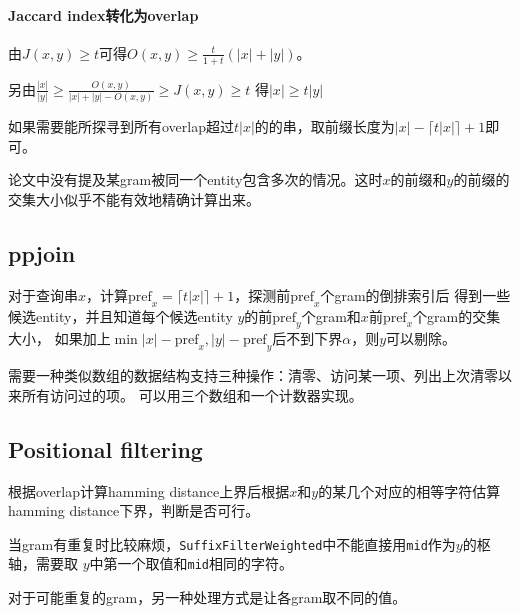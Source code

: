 \paragraph{Jaccard index转化为overlap}

由$J(x,y)\geq t$可得$O(x,y)\geq \frac{t}{1+t}(|x|+|y|)$。

另由$ \frac{|x|}{|y|} \geq \frac{O(x,y)}{|x|+|y|-O(x,y)} \geq J(x,y) \geq t $
得$|x| \geq t |y|$

如果需要能所探寻到所有overlap超过$t|x|$的的串，取前缀长度为$|x|-\lceil t |x|\rceil+1$即可。

论文中没有提及某gram被同一个entity包含多次的情况。这时$x$的前缀和$y$的前缀的交集大小似乎不能有效地精确计算出来。

\subsection{ppjoin}

对于查询串$x$，计算$\text{pref}_x=\lceil t |x|\rceil+1$，探测前$\text{pref}_x$个gram的倒排索引后
得到一些候选entity，并且知道每个候选entity $y$的前$\text{pref}_y$个gram和$x$前$\text{pref}_x$个gram的交集大小，
如果加上$\min{|x|-\text{pref}_x,|y|-\text{pref}_y}$后不到下界$\alpha$，则$y$可以剔除。

需要一种类似数组的数据结构支持三种操作：清零、访问某一项、列出上次清零以来所有访问过的项。
可以用三个数组和一个计数器实现。

\subsection{Positional filtering}

根据overlap计算hamming distance上界后根据$x$和$y$的某几个对应的相等字符估算hamming distance下界，判断是否可行。

当gram有重复时比较麻烦，\texttt{SuffixFilterWeighted}中不能直接用\texttt{mid}作为$y$的枢轴，需要取
$y$中第一个取值和\texttt{mid}相同的字符。

对于可能重复的gram，另一种处理方式是让各gram取不同的值。

\printbibliography
